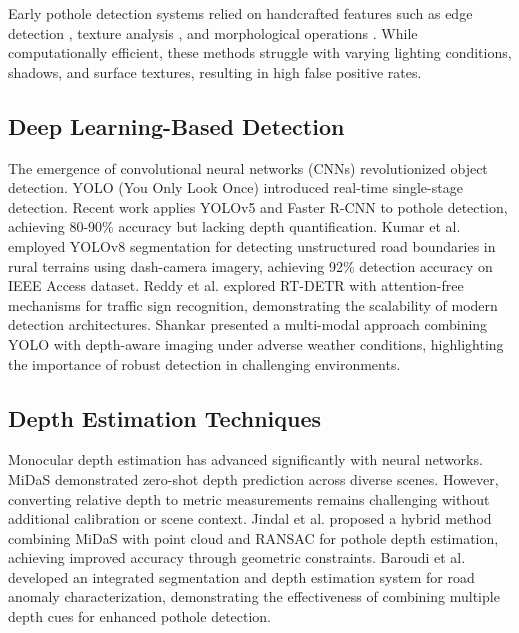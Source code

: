 \documentclass[conference]{IEEEtran}
\begin{document}
Early pothole detection systems relied on handcrafted features such as edge detection \cite{edge_detection}, texture analysis \cite{texture}, and morphological operations \cite{morphology}. While computationally efficient, these methods struggle with varying lighting conditions, shadows, and surface textures, resulting in high false positive rates.

\subsection{Deep Learning-Based Detection}

The emergence of convolutional neural networks (CNNs) revolutionized object detection. YOLO (You Only Look Once) \cite{yolo_orig} introduced real-time single-stage detection. Recent work applies YOLOv5 \cite{yolov5_pothole} and Faster R-CNN \cite{faster_rcnn_pothole} to pothole detection, achieving 80-90\% accuracy but lacking depth quantification. Kumar et al. \cite{kumar_yolov8} employed YOLOv8 segmentation for detecting unstructured road boundaries in rural terrains using dash-camera imagery, achieving 92\% detection accuracy on IEEE Access dataset. Reddy et al. \cite{reddy_rtdetr} explored RT-DETR with attention-free mechanisms for traffic sign recognition, demonstrating the scalability of modern detection architectures. Shankar \cite{shankar_multimodal} presented a multi-modal approach combining YOLO with depth-aware imaging under adverse weather conditions, highlighting the importance of robust detection in challenging environments.

\subsection{Depth Estimation Techniques}

Monocular depth estimation has advanced significantly with neural networks. MiDaS \cite{midas} demonstrated zero-shot depth prediction across diverse scenes. However, converting relative depth to metric measurements remains challenging without additional calibration or scene context. Jindal et al. \cite{jindal_hybrid} proposed a hybrid method combining MiDaS with point cloud and RANSAC for pothole depth estimation, achieving improved accuracy through geometric constraints. Baroudi et al. \cite{baroudi_enhanced} developed an integrated segmentation and depth estimation system for road anomaly characterization, demonstrating the effectiveness of combining multiple depth cues for enhanced pothole detection.
\end{document}
